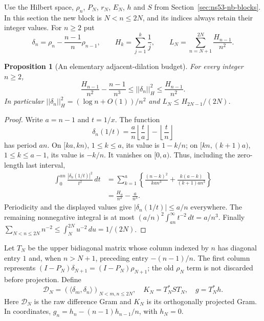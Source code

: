\documentclass[11pt]{article}
\def\norm#1{||#1||}%
\newtheorem{proposition}[theorem]{Proposition}
\theoremstyle{remark}
\newcommand{\norm}[1]{\left\lVert #1\right\rVert}
\begin{document}
Use the Hilbert space, $\rho_n$, $P_N$, $r_N$, $E_N$, $h$ and $S$ from
Section~\ref{sec:ns53-nb-blocks}. In this section the new block is
$N<n\leq 2N$, and its indices always retain their integer values.
For $n\geq2$ put
\begin{equation}
 \delta_n=\rho_n-\frac{n-1}{n}\rho_{n-1},\qquad
 H_k=\sum_{j=1}^k\frac1j,\qquad
 L_N=\sum_{n=N+1}^{2N}\frac{H_{n-1}}{n^2}.
 \label{eq:v158-difference-def}
\end{equation}

\begin{proposition}[An elementary adjacent-dilation budget]
\label{prop:v158-adjacent-budget}
For every integer $n\geq2$,
\begin{equation}
 \frac{H_{n-1}}{n^2}-\frac{n-1}{n^3}
 \leq \norm{\delta_n}_H^2
 \leq\frac{H_{n-1}}{n^2}.
 \label{eq:v158-adjacent-norm}
\end{equation}
In particular $\norm{\delta_n}_H^2=(\log n+O(1))/n^2$ and
$L_N\leq H_{2N-1}/(2N)$.
\end{proposition}
\begin{proof}
Write $a=n-1$ and $t=1/x$. The function
\[
 \delta_n(1/t)=\frac{a}{n}\left\lfloor\frac{t}{a}\right\rfloor
              -\left\lfloor\frac{t}{n}\right\rfloor
\]
has period $an$. On $[ka,kn)$, $1\leq k\leq a$, its value is
$1-k/n$; on $[kn,(k+1)a)$, $1\leq k\leq a-1$, its value is $-k/n$.
It vanishes on $[0,a)$. Thus, including the zero-length last interval,
\begin{align*}
 \int_0^{an}\frac{|\delta_n(1/t)|^2}{t^2}\,dt
 &=\sum_{k=1}^a\left\{
 \frac{(n-k)^2}{k a n^3}
 +\frac{k(a-k)}{(k+1)a n^3}\right\}\\
 &=\frac{H_a}{n^2}-\frac{a}{n^3}.
\end{align*}
Periodicity and the displayed values give $|\delta_n(1/t)|\leq a/n$ everywhere.
The remaining nonnegative integral is at most
$(a/n)^2\int_{an}^{\infty}t^{-2}\,dt=a/n^3$.
Finally $\sum_{N<n\leq2N}n^{-2}\leq\int_N^{2N}u^{-2}\,du=1/(2N)$.
\end{proof}

Let $T_N$ be the upper bidiagonal matrix whose column indexed by $n$
has diagonal entry $1$ and, when $n>N+1$, preceding entry $-(n-1)/n$.
The first column represents $(I-P_N)\delta_{N+1}=(I-P_N)\rho_{N+1}$;
the old $\rho_N$ term is not discarded before projection. Define
\begin{equation}
 \mathcal D_N=(\langle \delta_m,\delta_n\rangle)_{N<m,n\leq2N},\quad
 K_N=T_N^*S T_N,\quad g=T_N^*h.
 \label{eq:v158-difference-gram}
\end{equation}
Here $\mathcal D_N$ is the raw difference Gram and $K_N$ is its
orthogonally projected Gram. In coordinates,
$g_n=h_n-(n-1)h_{n-1}/n$, with $h_N=0$.
\end{document}
